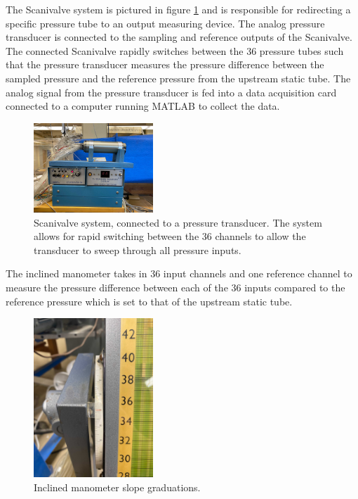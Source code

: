 \documentclass[runningheads]{llncs}
\begin{document}
\noindent
The Scanivalve system is pictured in figure \ref{fig:scanivalve} and is responsible for redirecting a specific pressure tube to an output measuring device. The analog pressure transducer is connected to the sampling and reference outputs of the Scanivalve. The connected Scanivalve rapidly switches between the 36 pressure tubes such that the pressure transducer measures the pressure difference between the sampled pressure and the reference pressure from the upstream static tube. The analog signal from the pressure transducer is fed into a data acquisition card connected to a computer running MATLAB to collect the data.\newline

\begin{figure}[h]
    \centering
    \includegraphics[width=0.4\textwidth]{Apparatus Pictures/scanivalve.jpg}
    \caption{Scanivalve system, connected to a pressure transducer. The system allows for rapid switching between the 36 channels to allow the transducer to sweep through all pressure inputs.}
    \label{fig:scanivalve}
\end{figure}

\noindent
The inclined manometer takes in 36 input channels and one reference channel to measure the pressure difference between each of the 36 inputs compared to the reference pressure which is set to that of the upstream static tube.

\begin{figure}[h]
    \centering
    \includegraphics[width=0.4\textwidth]{Apparatus Pictures/inclined_manometer_slope_graduations.jpg}
    \caption{Inclined manometer slope graduations.}
    \label{fig:manometer}
\end{figure}
\end{document}
